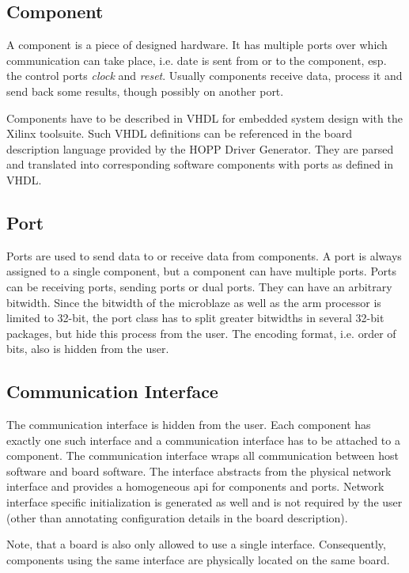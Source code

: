 \documentclass{report}
\begin{document}
\subsection{Component}
A component is a piece of designed hardware. It has multiple ports over which communication can take place, i.e. date is sent from or to the component, esp. the control ports \textit{clock} and \textit{reset}. Usually components receive data, process it and send back some results, though possibly on another port.

Components have to be described in VHDL for embedded system design with the Xilinx toolsuite. Such VHDL definitions can be referenced in the board description language provided by the HOPP Driver Generator. They are parsed and translated into corresponding software components with ports as defined in VHDL.

\subsection{Port}
Ports are used to send data to or receive data from components. A port is always assigned to a single component, but a component can have multiple ports. Ports can be receiving ports, sending ports or dual ports. They can have an arbitrary bitwidth. Since the bitwidth of the microblaze as well as the arm processor is limited to 32-bit, the port class has to split greater bitwidths in several 32-bit packages, but hide this process from the user. The encoding format, i.e. order of bits, also is hidden from the user.

\subsection{Communication Interface}
The communication interface is hidden from the user. Each component has exactly one such interface and a communication interface has to be attached to a component. The communication interface wraps all communication between host software and board software. The interface abstracts from the physical network interface and provides a homogeneous api for components and ports. Network interface specific initialization is generated as well and is not required by the user (other than annotating configuration details in the board description).

Note, that a board is also only allowed to use a single interface. Consequently, components using the same interface are physically located on the same board.
\end{document}
